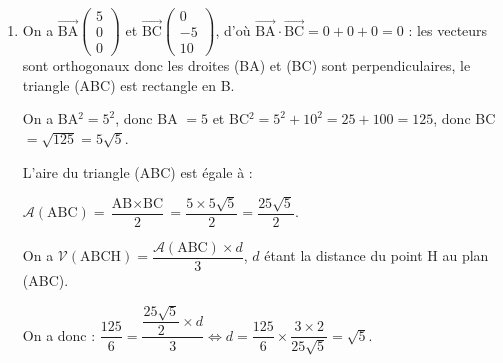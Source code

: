 \documentclass[10pt]{article}
\providecommand{\vect}[1]{\overrightarrow{#1}}
\begin{document}
\begin{enumerate}
\begin{enumerate}
		$\mathcal{V}(\text{ABCH}) = \dfrac{\mathcal{A}(\text{ABH}) \times \text{CO}}{3} = \dfrac{\frac{25}{4} \times 10}{3} = \dfrac{125}{6}$.
	\end{enumerate}
\item On a $\vect{\text{BA}}\begin{pmatrix}5\\0\\0\end{pmatrix}$ et $\vect{\text{BC}}\begin{pmatrix}0\\-5\\10\end{pmatrix}$, d'où $\vect{\text{BA}} \cdot \vect{\text{BC}} = 0 + 0 + 0 = 0$ : les vecteurs sont orthogonaux donc les droites (BA) et (BC) sont perpendiculaires, le triangle (ABC) est rectangle en B.

On a BA$^2 = 5^2$, donc BA $ = 5$ et BC$^2 = 5^2 + 10^2 = 25 + 100 = 125$, donc BC $= \sqrt{125} = 5 \sqrt 5$.

L'aire du triangle (ABC) est égale à :

$\mathcal{A}(\text{ABC}) = \dfrac{\text{AB} \times \text{BC}}{2} = \dfrac{ 5 \times 5 \sqrt 5}{2} = \dfrac{25\sqrt 5}{2}$.

On a $\mathcal{V}(\text{ABCH}) = \dfrac{\mathcal{A}(\text{ABC}) \times d}{3}$, $d$ étant la distance du point H au plan (ABC).

On a donc : $\dfrac{125}{6} = \dfrac{\dfrac{25\sqrt 5}{2} \times d}{3} \iff d = \dfrac{125}{6} \times \dfrac{3 \times 2}{25\sqrt 5} = \sqrt 5$.
\end{enumerate}

\bigskip
\end{document}
